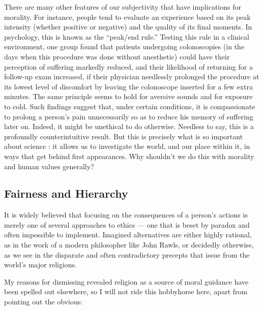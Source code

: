 \documentclass[a4paper,14pt]{extbook}
\begin{document}
There are many other features of our subjectivity that have implications for morality.
For instance, people tend to evaluate an experience based on its peak intensity (whether positive or negative) and the quality of its final moments.
In psychology, this is known as the ``peak/end rule.''
Testing this rule in a clinical environment, one group found that patients undergoing colonoscopies (in the days when this procedure was done without anesthetic) could have their perception of suffering markedly reduced, and their likelihood of returning for a follow-up exam increased, if their physician needlessly prolonged the procedure at its lowest level of discomfort by leaving the colonoscope inserted for a few extra minutes.
The same principle seems to hold for aversive sounds and for exposure to cold.
Such findings suggest that, under certain conditions, it is compassionate to prolong a person's pain unnecessarily so as to reduce his memory of suffering later on.
Indeed, it might be unethical to do otherwise.
Needless to say, this is a profoundly counterintuitive result.
But this is precisely what is so important about science :
it allows us to investigate the world, and our place within it, in ways that get behind first appearances.
Why shouldn't we do this with morality and human values generally?


\subsection{Fairness and Hierarchy}

It is widely believed that focusing on the consequences of a person's actions is merely one of several approaches to ethics --- one that is beset by paradox and often impossible to implement.
Imagined alternatives are either highly rational, as in the work of a modern philosopher like John Rawls, or decidedly otherwise, as we see in the disparate and often contradictory precepts that issue from the world's major religions.

My reasons for dismissing revealed religion as a source of moral guidance have been spelled out elsewhere, so I will not ride this hobbyhorse here, apart from pointing out the obvious:
\end{document}
